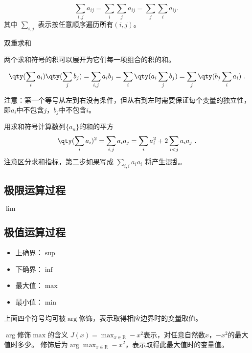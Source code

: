 \begin{equation}
\sum_{i,j} a_{ij}=\sum_{i} \sum_{j} a_{ij} = \sum_{j} \sum_{i} a_{ij}.~
\end{equation}
其中 $\sum\limits_{i,j}$ 表示按任意顺序遍历所有$(i,j)$。

双重求和

两个求和符号的积可以展开为它们每一项组合的积的和。

\begin{equation}
\qty(\sum_i a_i) \qty(\sum_j b_j) = \sum_{i,j} a_i b_j = \sum_i \qty(a_i \sum_j b_j) = \sum_j \qty(b_j \sum_i a_i)~.
\end{equation}

注意：第一个等号从左到右没有条件，但从右到左时需要保证每个变量的独立性，即$a_i$中不包含$j$，$b_j$中不包含$i$。

\begin{example}{用求和符号计算数列$\{a_n\}$的和的平方}
$$\qty(\sum_i a_i)^2 = \sum_{i,j} a_i a_j = \sum_i a_i^2 + 2\sum_{i<j} a_i a_j~.$$
注意区分求和指标，第二步如果写成 $\sum\limits_{i,i} a_i a_i$ 将产生混乱。
\end{example}
\subsection{极限运算过程}

$\lim$

\subsection{极值运算过程}

\begin{itemize}
\item 上确界：$\sup$
\item 下确界：$\inf$
\item 最大值：$\max$
\item 最小值：$\min$
\end{itemize}

上面四个符号均可被$\arg$修饰，表示取得相应边界时的变量取值。

\begin{example}{$\arg$修饰$\max$的含义}
$J(x)=\displaystyle\max_{x\in{\mathrm R}} -x^2$表示，对任意自然数$x$，$-x^2$的最大值时多少。
修饰后为$\displaystyle\arg\max_{x\in{\mathrm R}} -x^2$，表示取得此最大值时的变量值。
\end{example}
